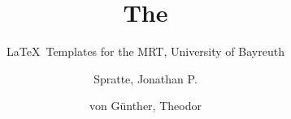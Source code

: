 \documentclass[oneside,UKenglish]{MRTthesis}
\title{The \cls{MRTbundle}}
\subtitle{\LaTeX\ Templates for the MRT, University of Bayreuth}
\author[J. P. Spratte, T. von Günther]{Spratte, Jonathan P. \and von Günther, Theodor}
\begin{document}
\maketitle
\tableofcontents
\mainpart






\end{document}
